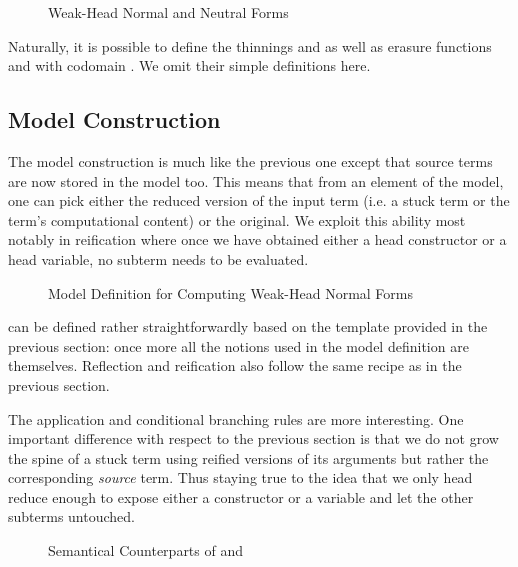 \begin{figure}[h]
\caption{Weak-Head Normal and Neutral Forms\label{fig:weakhead}}
\end{figure}

Naturally, it is possible to define the thinnings
 and  as well as erasure
functions  and 
with codomain . We omit their simple definitions here.

\subsection{Model Construction}

The model construction is much like the previous one except
that source terms are now stored in the model too. This means that
from an element of the model, one can pick either the reduced version
of the input term (i.e. a stuck term or the term's computational
content) or the original. We exploit this ability most
notably in reification where once we have obtained either a
head constructor or a head variable, no subterm needs to
be evaluated.

\begin{figure}[h]
\caption{Model Definition for Computing Weak-Head Normal Forms\label{fig:betaiotamodel}}
\end{figure}

 can be defined rather straightforwardly based on the template provided
in the previous section: once more all the notions used in the model definition
are  themselves. Reflection and reification also follow the same recipe
as in the previous section.


The application and conditional branching rules are more
interesting. One important difference with respect to the previous
section is that we do not grow the spine of a stuck term using
reified versions of its arguments but rather the corresponding
\emph{source} term. Thus staying true to the idea that we only head
reduce enough to expose either a constructor or a variable and let
the other subterms untouched.

\begin{figure}[h]
\caption{Semantical Counterparts of  and \label{fig:betaiotaappifte}}
\end{figure}

